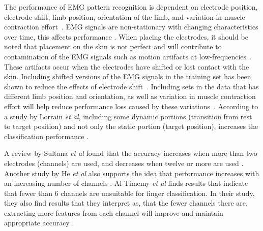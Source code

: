 \label{section:electrodes}
The performance of EMG pattern recognition is dependent on electrode position, electrode shift, limb position, orientation of the limb, and variation in muscle contraction effort~\cite{schemeElectromyogramPatternRecognition2011}\cite{phinyomarkFeatureExtractionSelection2018}. EMG signals are non-stationary with changing characteristics over time, this affects performance \cite{phinyomarkFeatureExtractionSelection2018}. 
When placing the electrodes, it should be noted that placement on the skin is not perfect and will contribute to contamination of the EMG signals such as motion artifacts at low-frequencies~\cite{botrosElectromyographyBasedGestureRecognition2022}. These artifacts occur when the electrodes have shifted or lost contact with the skin. %
Including shifted versions of the EMG signals in the training set has been shown to reduce the effects of electrode shift~\cite{schemeElectromyogramPatternRecognition2011}. Including sets in the data that has different limb position and orientation, as well as variation in muscle contraction effort will help reduce performance loss caused by these variations~\cite{schemeElectromyogramPatternRecognition2011}.
According to a study by Lorrain \textit{et al}, including some dynamic portions (transition from rest to target position) and not only the static portion (target position), increases the classification performance \cite{lorrainInfluenceTrainingSet2011}\cite{tsaiComparisonUpperlimbMotion2014}.

A review by Sultana \textit{et al} found that the accuracy increases when more than two electrodes (channels) are used, and decreases when twelve or more are used \cite{sultanaSystematicReviewSurface2023}. Another study by He \textit{et al} also supports the idea that performance increases with an increasing number of channels \cite{heSpatialInformationEnhances2019}. Al-Timemy \textit{et al} finds results that indicate that fewer than 6 channels are unsuitable for finger classification. In their study, they also find results that they interpret as, that the fewer channels there are, extracting more features from each channel will improve and maintain appropriate accuracy \cite{al-timemyClassificationFingerMovements2013}. 



